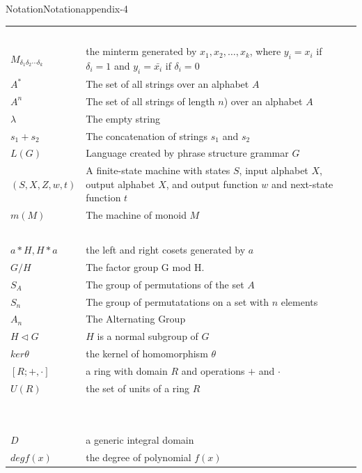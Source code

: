 \documentclass[twoside,10pt,]{book}
\numberwithin{equation}{section}
\begin{document}
\begin{appendixptx}{Notation}{}{Notation}{}{}{appendix-4}
\begin{longtable}[l]{lp{}r}
\(\)&&\pageref{notation-86}\\
\(M_{\delta_1 \delta_2 \cdots \delta_k}\)&the minterm generated by \(x_1, x_2, \ldots , x_k\), where  \(y_i=x_i\) if \(\delta_i = 1\) and \(y_i=\bar{x_i}\) if \(\delta_i = 0\)&\pageref{notation-87}\\
\(A^*\)&The set of all strings over an alphabet \(A\)&\pageref{notation-88}\\
\(A^n\)&The set of all strings of length \(n\)) over an alphabet \(A\)&\pageref{notation-89}\\
\(\lambda\)&The empty string&\pageref{notation-90}\\
\(s_1+s_2\)&The concatenation of strings \(s_1\) and \(s_2\)&\pageref{notation-91}\\
\(L(G)\)&Language created by phrase structure grammar \(G\)&\pageref{notation-92}\\
\((S, X, Z, w, t)\)&A finite-state machine with states \(S\), input alphabet \(X\), output alphabet \(X\), and output function \(w\) and next-state function \(t\)&\pageref{notation-93}\\
\(m(M)\)&The machine of monoid \(M\)&\pageref{notation-94}\\
\(\)&&\pageref{notation-95}\\
\(a*H, H*a\)&the left and right cosets generated by \(a\)&\pageref{notation-96}\\
\(G/H\)&The factor group G mod H.&\pageref{notation-97}\\
\(S_A\)&The group of permutations of the set \(A\)&\pageref{notation-98}\\
\(S_n\)&The group of permutatations on a set with \(n\) elements&\pageref{notation-99}\\
\(A_n\)&The Alternating Group&\pageref{notation-100}\\
\(H \triangleleft  G\)&\(H\) is a normal subgroup of \(G\)&\pageref{notation-101}\\
\(ker \theta\)&the kernel of homomorphism \(\theta\)&\pageref{notation-102}\\
\([R; +, \cdot]\)&a ring with domain \(R\) and operations \(+\) and \(\cdot\)&\pageref{notation-103}\\
\(U(R)\)&the set of units of a ring \(R\)&\pageref{notation-104}\\
\(\)&&\pageref{notation-105}\\
\(\)&&\pageref{notation-106}\\
\(D\)&a generic integral domain&\pageref{notation-107}\\
\(deg f(x)\)&the degree of polynomial \(f(x)\)&\pageref{notation-108}\\

\end{longtable}
\end{appendixptx}
\end{document}
